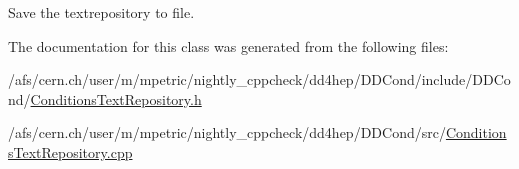 Save the textrepository to file. 

The documentation for this class was generated from the following files:\begin{DoxyCompactItemize}
\item 
/afs/cern.ch/user/m/mpetric/nightly\_\-cppcheck/dd4hep/DDCond/include/DDCond/\hyperlink{_conditions_text_repository_8h}{ConditionsTextRepository.h}\item 
/afs/cern.ch/user/m/mpetric/nightly\_\-cppcheck/dd4hep/DDCond/src/\hyperlink{_conditions_text_repository_8cpp}{ConditionsTextRepository.cpp}\end{DoxyCompactItemize}
